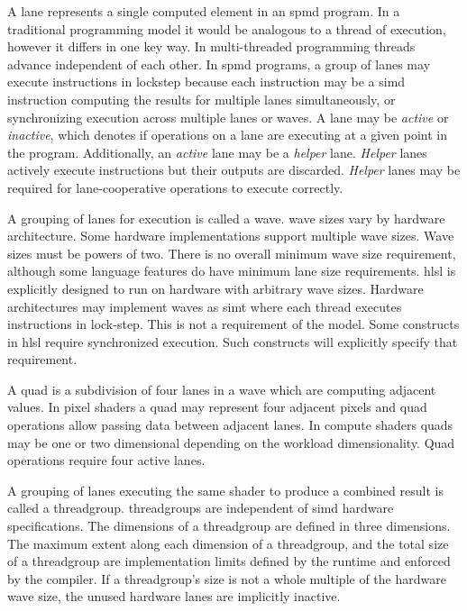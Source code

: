 
\p A \gls{lane} represents a single computed element in an \acrshort{spmd}
program. In a traditional programming model it would be analogous to a thread of
execution, however it differs in one key way. In multi-threaded programming
threads advance independent of each other. In \acrshort{spmd} programs, a group
of \gls{lane}s may execute instructions in lockstep because each instruction may
be a \acrshort{simd} instruction computing the results for multiple \gls{lane}s
simultaneously, or synchronizing execution across multiple \gls{lane}s or
\gls{wave}s. A lane may be \textit{active} or \textit{inactive}, which denotes
if operations on a lane are executing at a given point in the program.
Additionally, an \textit{active} lane may be a \textit{helper} lane.
\textit{Helper} lanes actively execute instructions but their outputs are
discarded. \textit{Helper} lanes may be required for \gls{lane}-cooperative
operations to execute correctly.


\p A grouping of \gls{lane}s for execution is called a \gls{wave}. \gls{wave}
sizes vary by hardware architecture. Some hardware implementations support
multiple wave sizes. Wave sizes must be powers of two. There is no overall
minimum wave size requirement, although some language features do have minimum
lane size requirements. \acrshort{hlsl} is explicitly designed to run on
hardware with arbitrary \gls{wave} sizes. Hardware architectures may implement
\gls{wave}s as \acrfull{simt} where each thread executes instructions in
lock-step. This is not a requirement of the model. Some constructs in
\acrshort{hlsl} require synchronized execution. Such constructs will explicitly
specify that requirement.


\p A \gls{quad} is a subdivision of four \gls{lane}s in a \gls{wave} which are
computing adjacent values. In pixel shaders a \gls{quad} may represent four
adjacent pixels and \gls{quad} operations allow passing data between adjacent
\gls{lane}s. In compute shaders quads may be one or two dimensional depending
on the workload dimensionality. Quad operations require four active \gls{lane}s.


\p A grouping of \gls{lane}s executing the same shader to produce a combined
result is called a \gls{threadgroup}. \gls{threadgroup}s are independent of
\acrshort{simd} hardware specifications. The dimensions of a \gls{threadgroup}
are defined in three dimensions. The maximum extent along each dimension of a
\gls{threadgroup}, and the total size of a \gls{threadgroup} are implementation
limits defined by the runtime and enforced by the compiler. If a
\gls{threadgroup}'s size is not a whole multiple of the hardware \gls{wave}
size, the unused hardware \gls{lane}s are implicitly inactive.

